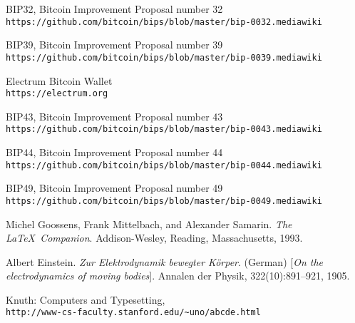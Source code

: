 \documentclass[
11pt, %
oneside, %
english, %
singlespacing, %
toctotoc, %
headsepline, %
]{MastersDoctoralThesis} %
\begin{document}
	
	
	
	
	\begin{thebibliography}{9}
		BIP32, Bitcoin Improvement Proposal number 32 \\
		\texttt{https://github.com/bitcoin/bips/blob/master/bip-0032.mediawiki} 
		
		BIP39, Bitcoin Improvement Proposal number 39 \\
		\texttt{https://github.com/bitcoin/bips/blob/master/bip-0039.mediawiki} 
		
		
		Electrum Bitcoin Wallet \\
		\texttt{https://electrum.org}
		
		BIP43, Bitcoin Improvement Proposal number 43 \\
		\texttt{https://github.com/bitcoin/bips/blob/master/bip-0043.mediawiki}
		
		BIP44, Bitcoin Improvement Proposal number 44 \\
		\texttt{https://github.com/bitcoin/bips/blob/master/bip-0044.mediawiki}
		
		BIP49, Bitcoin Improvement Proposal number 49 \\
		\texttt{https://github.com/bitcoin/bips/blob/master/bip-0049.mediawiki}
		
		Michel Goossens, Frank Mittelbach, and Alexander Samarin. 
		\textit{The \LaTeX\ Companion}. 
		Addison-Wesley, Reading, Massachusetts, 1993.
		
		Albert Einstein. 
		\textit{Zur Elektrodynamik bewegter K{\"o}rper}. (German) 
		[\textit{On the electrodynamics of moving bodies}]. 
		Annalen der Physik, 322(10):891–921, 1905.
		
		Knuth: Computers and Typesetting,
		\\\texttt{http://www-cs-faculty.stanford.edu/\~{}uno/abcde.html}
	\end{thebibliography}

%
%
	
	\printbibliography[heading=bibintoc]
	
	
\end{document}
